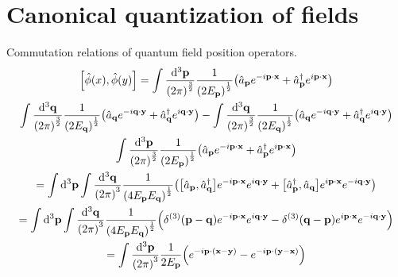 \documentclass{report}
\begin{document}
\chapter{Canonical quantization of fields}

\begin{subquests}
	\item Commutation relations of quantum field position operators.
	\begin{gather*}
		\bqty{\hat{\phi}(x),\hat{\phi}(y)} = \int \frac{\dd^3{\vb p}}{\pqty{2\pi}^{\frac{3}{2}}}\frac{1}{\pqty{2E_{\vb p}}^{\frac{1}{2}}}\pqty{\hat{a}_{\vb p}e^{-i\vb p\cdot \vb x} + \hat{a}^{\dagger}_{\vb p}e^{i \vb p\cdot \vb x}} \\
		\int \frac{\dd^3{\vb q}}{\pqty{2\pi}^{\frac{3}{2}}}\frac{1}{\pqty{2E_{\vb q}}^{\frac{1}{2}}}\pqty{\hat{a}_{\vb q}e^{-i\vb q\cdot \vb y} + \hat{a}^{\dagger}_{\vb q}e^{i\vb q\cdot \vb y}} - \int \frac{\dd^3{\vb q}}{\pqty{2\pi}^{\frac{3}{2}}}\frac{1}{\pqty{2E_{\vb q}}^{\frac{1}{2}}}\pqty{\hat{a}_{\vb q}e^{-i\vb q\cdot \vb y} + \hat{a}^{\dagger}_{\vb q}e^{i\vb q\cdot \vb y}} \\
		\int \frac{\dd^3{\vb p}}{\pqty{2\pi}^{\frac{3}{2}}}\frac{1}{\pqty{2E_{\vb p}}^{\frac{1}{2}}}\pqty{\hat{a}_{\vb p}e^{-i\vb p\cdot \vb x} + \hat{a}^{\dagger}_{\vb p}e^{i\vb p\cdot \vb x}} \\
		= \int \dd^3{\vb p}\int \frac{\dd^3{\vb q}}{\pqty{2\pi}^3}\frac{1}{\pqty{4E_{\vb p}E_{\vb q}}^{\frac{1}{2}}}\pqty{\bqty{\hat{a}_{\vb p},\hat{a}^{\dagger}_{\vb q}}e^{-i\vb p\cdot \vb x}e^{i\vb q\cdot \vb y} + \bqty{\hat{a}^{\dagger}_{\vb p},\hat{a}_{\vb q}}e^{i\vb p\cdot \vb x}e^{-i\vb q\cdot \vb y}} \\
		= \int \dd^3{\vb p}\int \frac{\dd^3{\vb q}}{\pqty{2\pi}^3}\frac{1}{\pqty{4E_{\vb p}E_{\vb q}}^{\frac{1}{2}}}\pqty{\delta^{(3)}\pqty{\vb p - \vb q}e^{-i\vb p\cdot \vb x}e^{i\vb q\cdot \vb y} - \delta^{(3)}\pqty{\vb q - \vb p}e^{i\vb p\cdot \vb x}e^{-i\vb q\cdot \vb y}} \\
		= \int\frac{\dd^3{\vb p}}{\pqty{2\pi}^3}\frac{1}{2E_{\vb p}}\pqty{e^{-i\vb p\cdot(\vb x- \vb y)} - e^{-i\vb p\cdot(\vb y - \vb x)}}
	\end{gather*}


\end{subquests}
\end{document}

